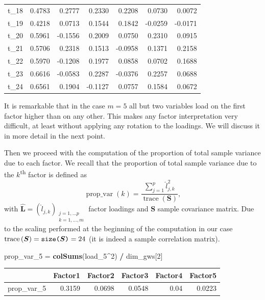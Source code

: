 \documentclass[
]{article}
\newenvironment{Shaded}{\begin{snugshade}}{\end{snugshade}}
\newcommand{\DecValTok}[1]{\textcolor[rgb]{0.00,0.00,0.81}{#1}}
\newcommand{\FunctionTok}[1]{\textcolor[rgb]{0.13,0.29,0.53}{\textbf{#1}}}
\newcommand{\NormalTok}[1]{#1}
\newcommand{\OtherTok}[1]{\textcolor[rgb]{0.56,0.35,0.01}{#1}}
\newcommand{\SpecialCharTok}[1]{\textcolor[rgb]{0.81,0.36,0.00}{\textbf{#1}}}
\theoremstyle{plain}
\begin{document}
\begin{longtable}[]{@{}lrrrrrr@{}}
t\_18 & 0.4783 & 0.2777 & 0.2330 & 0.2208 & 0.0730 & 0.0072 \\
t\_19 & 0.4218 & 0.0713 & 0.1544 & 0.1842 & -0.0259 & -0.0171 \\
t\_20 & 0.5961 & -0.1556 & 0.2009 & 0.0750 & 0.2310 & 0.0915 \\
t\_21 & 0.5706 & 0.2318 & 0.1513 & -0.0958 & 0.1371 & 0.2158 \\
t\_22 & 0.5970 & -0.1208 & 0.1977 & 0.0858 & 0.0702 & 0.1688 \\
t\_23 & 0.6616 & -0.0583 & 0.2287 & -0.0376 & 0.2257 & 0.0688 \\
t\_24 & 0.6561 & 0.1904 & -0.1127 & 0.0757 & 0.1584 & 0.0672 \\
\end{longtable}

It is remarkable that in the case \(m = 5\) all but two variables load
on the first factor higher than on any other. This makes any factor
interpretation very difficult, at least without applying any rotation to
the loadings. We will discuss it in more detail in the next point.

Then we proceed with the computation of the proportion of total sample
variance due to each factor. \newline We recall that the proportion of
total sample variance due to the \(k\)\textsuperscript{th} factor is
defined as \[
    \operatorname{prop\_var}(k) = \frac{\sum_{j = 1}^{p} \hat{l}_{j, k}^2}{\operatorname{trace}\left(\boldsymbol{S}\right)},
\] with
\(\hat{\boldsymbol{L}} = \left(\hat{l}_{j, k}\right)_{\substack{j = 1, \dots p \\ k = 1, \dots, m}}\)
factor loadings and \(\boldsymbol{S}\) sample covariance matrix.
\newline Due to the scaling performed at the beginning of the
computation in our case
\(\operatorname{trace}\left(\boldsymbol{S}\right) = \text{\texttt{size(}}\boldsymbol{S}\text{\texttt{)}} = 24\)
(it is indeed a sample correlation matrix).

\smallskip

\begin{Shaded}
\begin{Highlighting}[]
\NormalTok{prop\_var\_5 }\OtherTok{=} \FunctionTok{colSums}\NormalTok{(load\_5}\SpecialCharTok{\^{}}\DecValTok{2}\NormalTok{) }\SpecialCharTok{/}\NormalTok{ dim\_gws[}\DecValTok{2}\NormalTok{]}
\end{Highlighting}
\end{Shaded}

\begin{longtable}[]{@{}lrrrrr@{}}
\toprule\noalign{}
& Factor1 & Factor2 & Factor3 & Factor4 & Factor5 \\
\midrule\noalign{}
\endhead
\bottomrule\noalign{}
\endlastfoot
prop\_var\_5 & 0.3159 & 0.0698 & 0.0548 & 0.04 & 0.0223 \\
\end{longtable}
\end{document}
